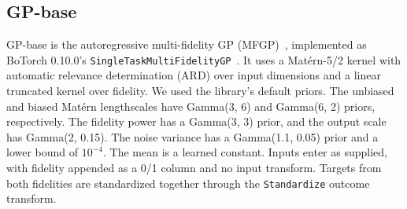 \subsection{GP-base}

GP-base is the autoregressive multi-fidelity GP (MFGP)~\citep{kennedy2000predicting}, implemented as BoTorch 0.10.0's \texttt{SingleTaskMultiFidelityGP}~\citep{balandat2020botorch}. It uses a Mat\'{e}rn-5/2 kernel with automatic relevance determination (ARD) over input dimensions and a linear truncated kernel over fidelity. We used the library's default priors. The unbiased and biased Mat\'{e}rn lengthscales have Gamma(3, 6) and Gamma(6, 2) priors, respectively. The fidelity power has a Gamma(3, 3) prior, and the output scale has Gamma(2, 0.15). The noise variance has a Gamma(1.1, 0.05) prior and a lower bound of $10^{-4}$. The mean is a learned constant. Inputs enter as supplied, with fidelity appended as a 0/1 column and no input transform. Targets from both fidelities are standardized together through the \texttt{Standardize} outcome transform.


